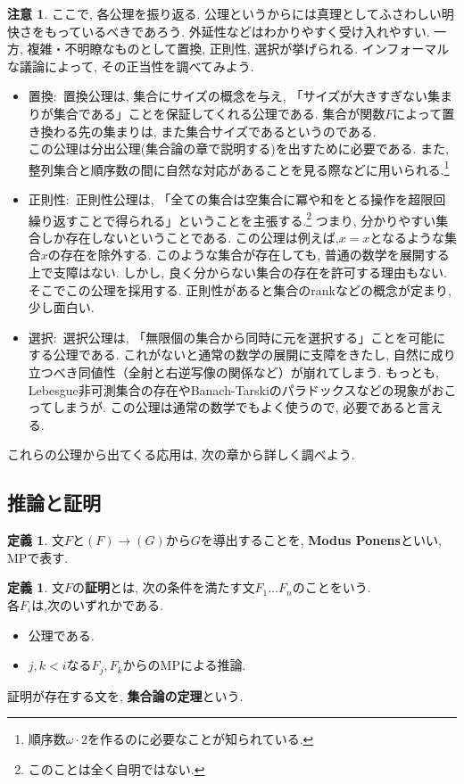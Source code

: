 \documentclass[a4paper]{bxjsarticle}
\theoremstyle{definition}
\newtheorem{defn}[thm]{定義}
\newtheorem{rem}[thm]{注意}
\begin{document}
        \begin{rem}
        ここで, 各公理を振り返る. 公理というからには真理としてふさわしい明快さをもっているべきであろう. 外延性などはわかりやすく受け入れやすい. 一方, 複雑・不明瞭なものとして置換, 正則性, 選択が挙げられる. インフォーマルな議論によって, その正当性を調べてみよう.
        \begin{itemize}
            \item 置換$\colon$ 置換公理は, 集合にサイズの概念を与え, 「サイズが大きすぎない集まりが集合である」ことを保証してくれる公理である. 集合が関数$F$によって置き換わる先の集まりは, また集合サイズであるというのである.\\
            この公理は分出公理(集合論の章で説明する)を出すために必要である. また, 整列集合と順序数の間に自然な対応があることを見る際などに用いられる.\footnote{順序数$\omega \cdot 2$を作るのに必要なことが知られている.} 
            \item 正則性$\colon$ 正則性公理は,  「全ての集合は空集合に冪や和をとる操作を超限回繰り返すことで得られる」ということを主張する.\footnote{このことは全く自明ではない.} つまり, 分かりやすい集合しか存在しないということである. この公理は例えば,$x={x}$となるような集合$x$の存在を除外する. このような集合が存在しても, 普通の数学を展開する上で支障はない. しかし, 良く分からない集合の存在を許可する理由もない. そこでこの公理を採用する. 正則性があると集合のrankなどの概念が定まり, 少し面白い.
            \item 選択$\colon$ 選択公理は, 「無限個の集合から同時に元を選択する」ことを可能にする公理である. これがないと通常の数学の展開に支障をきたし, 自然に成り立つべき同値性（全射と右逆写像の関係など）が崩れてしまう. もっとも, Lebesgue非可測集合の存在やBanach-Tarskiのパラドックスなどの現象がおこってしまうが. この公理は通常の数学でもよく使うので, 必要であると言える.
        \end{itemize}
        これらの公理から出てくる応用は, 次の章から詳しく調べよう.
        \end{rem}
    \subsection{推論と証明}
        \begin{defn}
            文$F$と$(F) \to (G)$から$G$を導出することを, \textbf{Modus Ponens}といい, MPで表す. 
        \end{defn}
        \begin{defn}
            文$F$の\textbf{証明}とは, 次の条件を満たす文$F_1 \dots F_n$のことをいう.\\
            各$F_i$は,次のいずれかである.
            \begin{itemize}
                \item 公理である.
                \item $j, k < i$なる$F_j, F_k$からのMPによる推論.
             \end{itemize}
            証明が存在する文を, \textbf{集合論の定理}という.
        \end{defn}
        
\end{document}
